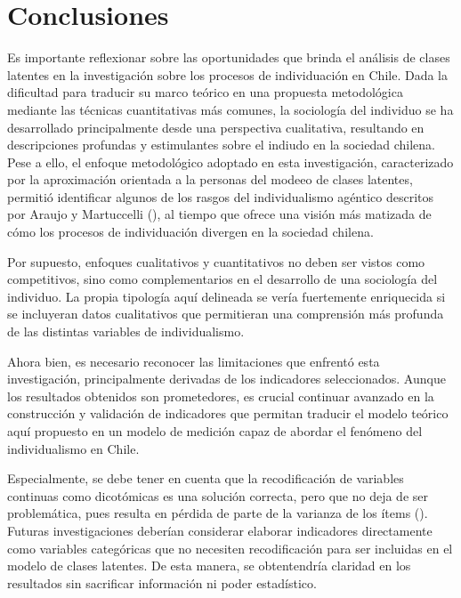 \documentclass[
  12pt,
  letterpaper,
  DIV=11,
  numbers=noendperiod]{scrartcl}
\begin{document}
\section{Conclusiones}\label{conclusiones}

Es importante reflexionar sobre las oportunidades que brinda el análisis
de clases latentes en la investigación sobre los procesos de
individuación en Chile. Dada la dificultad para traducir su marco
teórico en una propuesta metodológica mediante las técnicas
cuantitativas más comunes, la sociología del individuo se ha
desarrollado principalmente desde una perspectiva cualitativa,
resultando en descripciones profundas y estimulantes sobre el indiudo en
la sociedad chilena. Pese a ello, el enfoque metodológico adoptado en
esta investigación, caracterizado por la aproximación orientada a la
personas del modeeo de clases latentes, permitió identificar algunos de
los rasgos del individualismo agéntico descritos por Araujo y
Martuccelli (), al tiempo que ofrece una
visión más matizada de cómo los procesos de individuación divergen en la
sociedad chilena.

Por supuesto, enfoques cualitativos y cuantitativos no deben ser vistos
como competitivos, sino como complementarios en el desarrollo de una
sociología del individuo. La propia tipología aquí delineada se vería
fuertemente enriquecida si se incluyeran datos cualitativos que
permitieran una comprensión más profunda de las distintas variables de
individualismo.

Ahora bien, es necesario reconocer las limitaciones que enfrentó esta
investigación, principalmente derivadas de los indicadores
seleccionados. Aunque los resultados obtenidos son prometedores, es
crucial continuar avanzado en la construcción y validación de
indicadores que permitan traducir el modelo teórico aquí propuesto en un
modelo de medición capaz de abordar el fenómeno del individualismo en
Chile.

Especialmente, se debe tener en cuenta que la recodificación de
variables continuas como dicotómicas es una solución correcta, pero que
no deja de ser problemática, pues resulta en pérdida de parte de la
varianza de los ítems (). Futuras investigaciones deberían considerar elaborar indicadores
directamente como variables categóricas que no necesiten recodificación
para ser incluidas en el modelo de clases latentes. De esta manera, se
obtentendría claridad en los resultados sin sacrificar información ni
poder estadístico.
\end{document}
